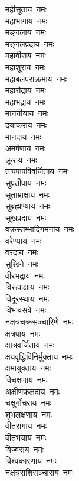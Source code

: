 \begin{flushleft}
\begin{multicols}{2}
महीसुताय~नमः\\
महाभागाय~नमः\\
मङ्गलाय~नमः\\
मङ्गलप्रदाय~नमः\\
महावीराय~नमः\\
महाशूराय~नमः\\
महाबलपराक्रमाय~नमः\\
महारौद्राय~नमः\\
महाभद्राय~नमः\\
माननीयाय~नमः\hfill{}\\
दयाकराय~नमः\\
मानदाय~नमः\\
अमर्षणाय~नमः\\
क्रूराय~नमः\\
तापपापविवर्जिताय~नमः\\
सुप्रतीपाय~नमः\\
सुताम्राक्षाय~नमः\\
सुब्रह्मण्याय~नमः\\
सुखप्रदाय~नमः\\
वक्रस्तम्भादिगमनाय~नमः\hfill{}\\
वरेण्याय~नमः\\
वरदाय~नमः\\
सुखिने~नमः\\
वीरभद्राय~नमः\\
विरूपाक्षाय~नमः\\
विदूरस्थाय~नमः\\
विभावसवे~नमः\\
नक्षत्रचक्रसञ्चारिणे~नमः\\
क्षत्रपाय~नमः\\
क्षात्रवर्जिताय~नमः\hfill{}\\
क्षयवृद्धिविनिर्मुक्ताय~नमः\\
क्षमायुक्ताय~नमः\\
विचक्षणाय~नमः\\
अक्षीणफलदाय~नमः\\
चक्षुर्गोचराय~नमः\\
शुभलक्षणाय~नमः\\
वीतरागाय~नमः\\
वीतभयाय~नमः\\
विज्वराय~नमः\\
विश्वकारणाय~नमः\hfill{}\\
नक्षत्रराशिसञ्चाराय~नमः\\

\end{multicols}
\end{flushleft}

